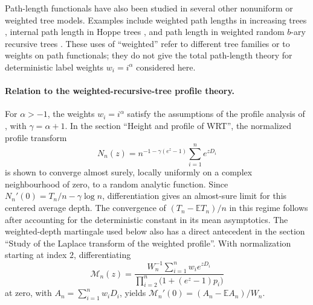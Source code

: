 \documentclass[11pt,a4paper]{article}
\newcommand{\1}{\mathbf{1}}
\begin{document}
Path-length functionals have also been studied in several other nonuniform or
weighted tree models.  Examples include weighted path lengths in increasing
trees \citep{KubaPanholzer2007}, internal path length in Hoppe trees
\citep{LeckeyNeininger2013}, and path length in weighted random $b$-ary
recursive trees \citep{MunsoniusRuschendorf2011}.  These uses of ``weighted''
refer to different tree families or to weights on path functionals; they do
not give the total path-length theory for deterministic label weights
$w_i=i^\alpha$ considered here.

\paragraph{Relation to the weighted-recursive-tree profile theory.}
For $\alpha>-1$, the weights $w_i=i^\alpha$ satisfy the assumptions of the
profile analysis of \citet{Senizergues2021}, with $\gamma=\alpha+1$.
In the section ``Height and profile of WRT'', the normalized profile transform
\[
  N_n(z)=n^{-1-\gamma(e^z-1)}\sum_{i=1}^n e^{zD_i}
\]
is shown to converge almost surely, locally uniformly on a complex
neighbourhood of zero, to a random analytic function.
Since $N_n'(0)=T_n/n-\gamma\log n$, differentiation gives an almost-sure
limit for this centered average depth. The convergence of
$(T_n-\mathbb{E}T_n)/n$ in this regime follows after accounting for the
deterministic constant in its mean asymptotics.
The weighted-depth martingale used below also has a direct antecedent in
the section ``Study of the Laplace transform of the weighted profile''.
With normalization starting at index $2$, differentiating
\[
  \mathcal{M}_n(z)=
  \frac{W_n^{-1}\sum_{i=1}^n w_i e^{zD_i}}
       {\prod_{i=2}^n\bigl(1+(e^z-1)p_i\bigr)}
\]
at zero, with $A_n=\sum_{i=1}^n w_iD_i$, yields
$\mathcal{M}_n'(0)=(A_n-\mathbb{E}A_n)/W_n$.
\end{document}

